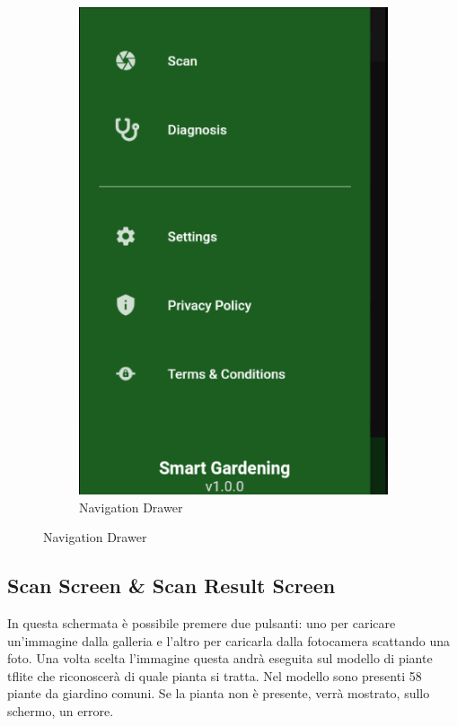 \documentclass[a4paper,12pt]{report}
\begin{document}
\begin{figure}[H]
\begin{subfigure}{0.3\textwidth}
		\includegraphics[width=\textwidth]{./images/navigation_drawer/navigation_drawer2.png}
		\caption{Navigation Drawer}
		\label{fig:navigation_drawer2}
	\end{subfigure}
\end{figure}

\subsection{Scan Screen \& Scan Result Screen}

\textsf{\small In questa schermata è possibile premere due pulsanti: uno per caricare un'immagine dalla galleria e l'altro per caricarla dalla fotocamera scattando una foto.}
\textsf{\small Una volta scelta l'immagine questa andrà eseguita sul modello di piante tflite che riconoscerà di quale pianta si tratta.}
\textsf{\small Nel modello sono presenti 58 piante da giardino comuni.}
\textsf{\small Se la pianta non è presente, verrà mostrato, sullo schermo, un errore.}
\end{document}
